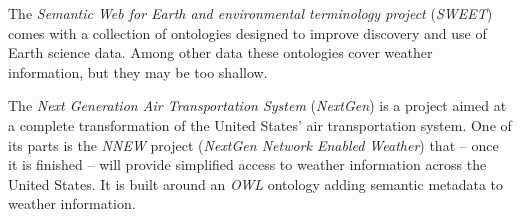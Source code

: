 \documentclass{scrartcl}
\begin{document}
The \textit{Semantic Web for Earth and environmental terminology project} (\textit{SWEET}) \cite{SWEET} comes with a collection of ontologies designed to improve discovery and use of Earth science data.
Among other data these ontologies cover weather information, but they may be too shallow.

The \textit{Next Generation Air Transportation System} (\textit{NextGen}) \cite{NextGen} is a project aimed at a complete transformation of the United States' air transportation system.
One of its parts is the \textit{NNEW} project (\textit{NextGen Network Enabled Weather}) that -- once it is finished -- will provide simplified access to weather information across the United States.
It is built around an \textit{OWL} ontology adding semantic metadata to weather information.



\end{document}
